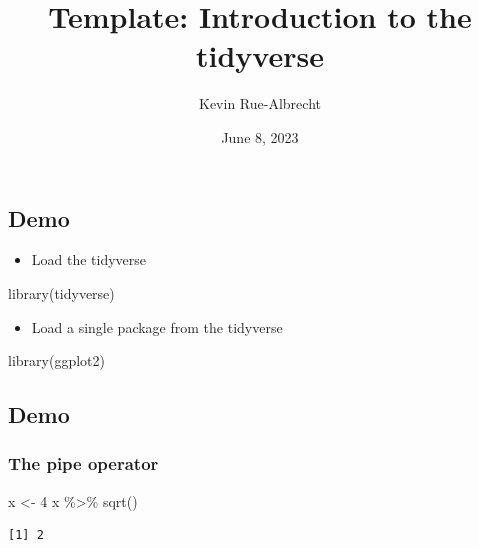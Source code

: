 \documentclass[
  letterpaper,
  DIV=11,
  numbers=noendperiod]{scrartcl}
\title{Template: Introduction to the tidyverse}
\author{Kevin Rue-Albrecht}
\date{June 8, 2023}
\newenvironment{Shaded}{\begin{snugshade}}{\end{snugshade}}
\newcommand{\DecValTok}[1]{\textcolor[rgb]{0.68,0.00,0.00}{#1}}
\newcommand{\FunctionTok}[1]{\textcolor[rgb]{0.28,0.35,0.67}{#1}}
\newcommand{\NormalTok}[1]{\textcolor[rgb]{0.00,0.23,0.31}{#1}}
\newcommand{\OtherTok}[1]{\textcolor[rgb]{0.00,0.23,0.31}{#1}}
\newcommand{\SpecialCharTok}[1]{\textcolor[rgb]{0.37,0.37,0.37}{#1}}
\providecommand{\tightlist}{%
  \setlength{\itemsep}{0pt}\setlength{\parskip}{0pt}}\usepackage{longtable,booktabs,array}
\begin{document}
\maketitle


\subsection{Demo}\label{demo}

\begin{itemize}
\tightlist
\item
  Load the tidyverse
\end{itemize}

\begin{Shaded}
\begin{Highlighting}[]
\FunctionTok{library}\NormalTok{(tidyverse)}
\end{Highlighting}
\end{Shaded}

\begin{itemize}
\tightlist
\item
  Load a single package from the tidyverse
\end{itemize}

\begin{Shaded}
\begin{Highlighting}[]
\FunctionTok{library}\NormalTok{(ggplot2)}
\end{Highlighting}
\end{Shaded}

\subsection{Demo}\label{demo-1}

\subsubsection{The pipe operator}\label{the-pipe-operator}

\begin{Shaded}
\begin{Highlighting}[]
\NormalTok{x }\OtherTok{\textless{}{-}} \DecValTok{4}
\NormalTok{x }\SpecialCharTok{\%\textgreater{}\%} \FunctionTok{sqrt}\NormalTok{()}
\end{Highlighting}
\end{Shaded}

\begin{verbatim}
[1] 2
\end{verbatim}
\end{document}
